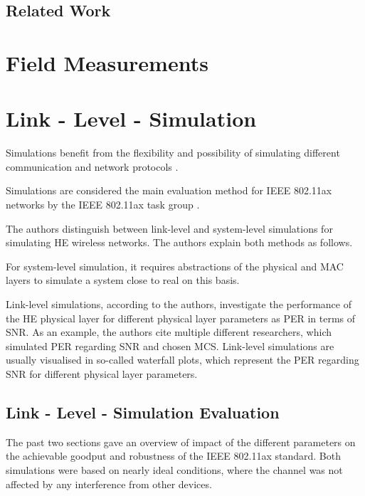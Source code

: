 \documentclass[]{nsm-thesis}
\begin{document}
\section{Related Work}





\chapter{Field Measurements}









\chapter{Link - Level - Simulation}

Simulations benefit from the flexibility and possibility of simulating different communication and network protocols \cite{kumar_simulators_2012}.

Simulations are considered the main evaluation method for IEEE 802.11ax networks by the IEEE 802.11ax task group \cite{omar_survey_2016}.

The authors distinguish between link-level and system-level simulations for simulating \ac{HE} wireless networks.
The authors explain both methods as follows.

For system-level simulation, it requires abstractions of the physical and MAC layers to simulate a system close to
real on this basis.

Link-level simulations, according to the authors,
investigate the performance of the \ac{HE} physical layer for different physical layer parameters as \ac{PER} in terms of \ac{SNR}.
As an example, the authors cite multiple different researchers, which simulated \ac{PER} regarding \ac{SNR} and chosen \ac{MCS}.
Link-level simulations are usually visualised in so-called waterfall plots, which represent the \ac{PER} regarding \ac{SNR} for
different physical layer parameters.







\section{Link - Level - Simulation Evaluation}

The past two sections gave an overview of impact of the different parameters on the achievable goodput and robustness of the IEEE 802.11ax standard.
Both simulations were based on nearly ideal conditions, where the channel was not affected by any interference from other devices.
\end{document}
